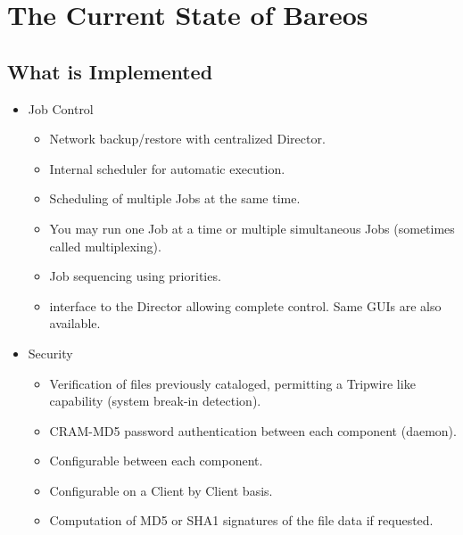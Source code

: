 
\section{The Current State of Bareos}
\label{StateChapter}

\subsection{What is Implemented}

\begin{itemize}
\item Job Control
   \begin{itemize}
   \item Network backup/restore with centralized Director.
   \item Internal scheduler for automatic
       execution.
   \item Scheduling of multiple Jobs at the same time.
   \item You may run one Job at a time or multiple simultaneous Jobs
         (sometimes called multiplexing).
   \item Job sequencing using priorities.
   \item {} interface to the Director allowing complete
      control.  Same GUIs are also available.
   \end{itemize}

\item Security
   \begin{itemize}
   \item Verification of files previously cataloged, permitting a Tripwire like
      capability (system break-in detection).
   \item CRAM-MD5 password authentication between each component (daemon).
   \item Configurable
       between each
            component.
   \item Configurable
      on a Client by Client basis.
   \item Computation of MD5 or SHA1 signatures of the file data if requested.
   \end{itemize}



\end{itemize}
